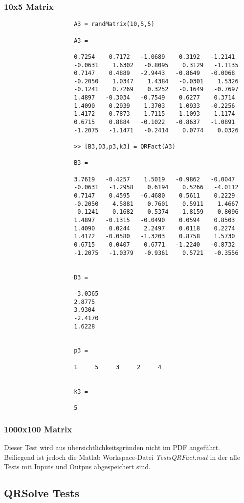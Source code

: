 \documentclass[11pt,titlepage]{article}
\begin{document}
			\subsubsection{10x5 Matrix}
				\begin{lstlisting}
					A3 = randMatrix(10,5,5)
					
					A3 =
					
					0.7254    0.7172   -1.0689    0.3192   -1.2141
					-0.0631    1.6302   -0.8095    0.3129   -1.1135
					0.7147    0.4889   -2.9443   -0.8649   -0.0068
					-0.2050    1.0347    1.4384   -0.0301    1.5326
					-0.1241    0.7269    0.3252   -0.1649   -0.7697
					1.4897   -0.3034   -0.7549    0.6277    0.3714
					1.4090    0.2939    1.3703    1.0933   -0.2256
					1.4172   -0.7873   -1.7115    1.1093    1.1174
					0.6715    0.8884   -0.1022   -0.8637   -1.0891
					-1.2075   -1.1471   -0.2414    0.0774    0.0326
					
					>> [B3,D3,p3,k3] = QRFact(A3)
					
					B3 =
					
					3.7619   -0.4257    1.5019   -0.9862   -0.0047
					-0.0631   -1.2958    0.6194    0.5266   -4.0112
					0.7147    0.4595   -6.4680    0.5611    0.2229
					-0.2050    4.5881    0.7601    0.5911    1.4667
					-0.1241    0.1682    0.5374   -1.8159   -0.8096
					1.4897   -0.1315   -0.0490    0.0594    0.8503
					1.4090    0.0244    2.2497    0.0118    0.2274
					1.4172   -0.0580   -1.3203    0.8758    1.5730
					0.6715    0.0407    0.6771   -1.2240   -0.8732
					-1.2075   -1.0379   -0.9361    0.5721   -0.3556
					
					
					D3 =
					
					-3.0365
					2.8775
					3.9304
					-2.4170
					1.6228
					
					
					p3 =
					
					1     5     3     2     4
					
					
					k3 =
					
					5
				\end{lstlisting}
			\subsubsection{1000x100 Matrix}
				Dieser Test wird aus übersichtlichkeitsgründen nicht im PDF angeführt. Beiliegend ist jedoch die Matlab Workspace-Datei \emph{TestsQRFact.mat} in der alle Tests mit Inputs und Outpus abgespeichert sind.
				
\newpage
		\subsection{QRSolve Tests}
\end{document}
